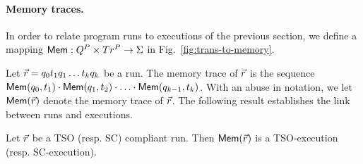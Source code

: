 \paragraph{Memory traces.}
In order to relate program runs to executions of the previous section, we define a mapping $\mathsf{Mem}:Q^{P}\times Tr^{P} \rightarrow \Sigma$ in Fig.~\ref{fig:trans-to-memory}.

Let $\vec{r}=q_0t_1q_1\ldots t_kq_k$ be a run.
The memory trace of $\vec{r}$ is the sequence $\mathsf{Mem}(q_0,t_1)\cdot \mathsf{Mem}(q_1,t_2) \cdot \ldots \cdot \mathsf{Mem}(q_{k-1},t_k)$.
With an abuse in notation, we let $\mathsf{Mem}(\vec{r})$ denote the memory trace of $\vec{r}$.
The following result establishes the link between runs and executions.

\begin{proposition}
Let $\vec{r}$ be a TSO (resp. SC) compliant run.
Then $\mathsf{Mem}(\vec{r})$ is a TSO-execution (resp. SC-execution).
\end{proposition}
